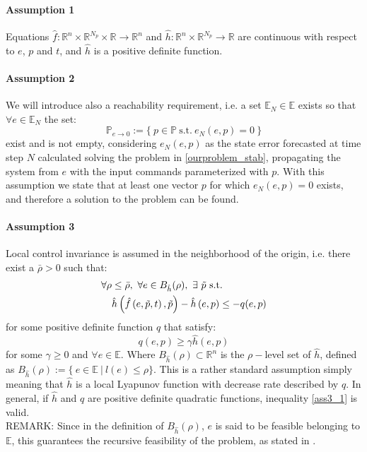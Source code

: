 \paragraph{Assumption 1} Equations $\hat{f}: \mathbb{R}^n\times\mathbb{R}^{N_p}\times\mathbb{R}\rightarrow\mathbb{R}^n$ and $\hat{h}: \mathbb{R}^n\times\mathbb{R}^{N_p}\rightarrow\mathbb{R}$ are continuous with respect to $e$, $p$ and $t$, and $\hat{h}$ is a positive definite function. 

\paragraph{Assumption 2} We will introduce also a reachability requirement, i.e. a set $\mathbb{E}_N\in\mathbb{E}$ exists so that $\forall e \in \mathbb{E}_N $ the set:
\begin{equation*}
	\mathbb{P}_{e \to 0}:=\lbrace \ p \in \mathbb{P}\ \text{s.t.}\ e_{N}(e,p)=0\ \rbrace
\end{equation*} exist and is not empty, considering $e_{N}(e,p)$ as the state error forecasted at time step $N$ calculated solving the problem in \ref{ourproblem_stab}, propagating the system from $e$ with the input commands parameterized with $p$. With this assumption we state that at least one vector $p$ for which $e_{N}(e,p)=0$ exists, and therefore a solution to the problem can be found.

\paragraph{Assumption 3} Local control invariance is assumed in the neighborhood of the origin, i.e. there exist a $\bar{\rho} > 0$ such that:
\begin{equation}
	\begin{split}
		\forall \rho &\leq \bar{\rho},\ \forall e \in B_{\hat{h}}(\rho),\ \exists\ \tilde{p}\ 	 \textnormal{s.t.} \\
		&\hat{h}\left(\hat{f}\left(e,\tilde{p},t\right),\tilde{p}\right)-\hat{h}\left(e,p\right) \leq -q(e,p) 
		\label{ass3}
	\end{split}
\end{equation}
for some positive definite function $q$ that satisfy:
\begin{equation}
	q(e,p) \ge \gamma \hat{h}(e,p)
	\label{ass3_1} 
\end{equation}
for some $\gamma \geq 0$ and $\forall e \in \mathbb{E}$.
Where $B_{\hat{h}}(\rho) \subset \mathbb{R}^n$ is the $\rho-$level set of $\hat{h}$, defined as $B_{\hat{h}}(\rho) := \lbrace\ e \in \mathbb{E}\ |\ l(e) \leq \rho \rbrace$. This is a rather standard assumption simply meaning that $\hat{h}$ is a local Lyapunov function with decrease rate described by $q$. In general, if $\hat{h}$ and $q$ are positive definite quadratic functions, inequality \ref{ass3_1} is valid.
\\{REMARK:  } Since in the definition of $B_{\hat{h}}(\rho)$, $e$ is said to be feasible belonging to $\mathbb{E}$, this guarantees the recursive feasibility of the problem, as stated in \cite{alamir2018stability}.

